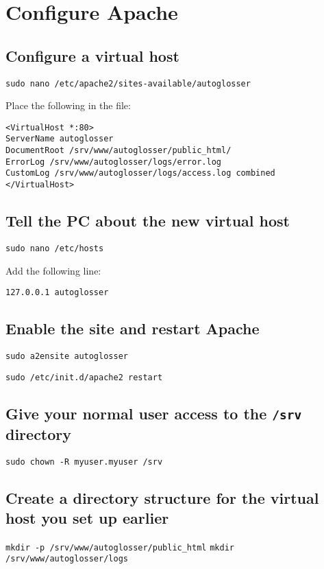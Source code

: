 \documentclass[a4paper,10pt]{article}
\begin{document}
\section{Configure Apache}

\subsection{Configure a virtual host}

\texttt{sudo nano /etc/apache2/sites-available/autoglosser}

Place the following in the file:

\begin{verbatim}
<VirtualHost *:80>
ServerName autoglosser
DocumentRoot /srv/www/autoglosser/public_html/
ErrorLog /srv/www/autoglosser/logs/error.log
CustomLog /srv/www/autoglosser/logs/access.log combined
</VirtualHost>
\end{verbatim}

\subsection{Tell the PC about the new virtual host}

\texttt{sudo nano /etc/hosts}

Add the following line:

\texttt{127.0.0.1	autoglosser}

\subsection{Enable the site and restart Apache}

\texttt{sudo a2ensite autoglosser}

\texttt{sudo /etc/init.d/apache2 restart}

\subsection{Give your normal user access to the \texttt{/srv} directory}

\texttt{sudo chown -R myuser.myuser /srv}

\subsection{Create a directory structure for the virtual host you set up earlier}

\texttt{mkdir -p /srv/www/autoglosser/public\_html}
\texttt{mkdir /srv/www/autoglosser/logs}
\end{document}
